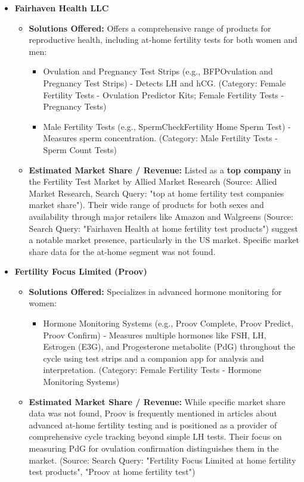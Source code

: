 \documentclass{article}
\begin{document}
\begin{itemize}[label=\textbullet]
    \item \textbf{Fairhaven Health LLC}
    \begin{itemize}[label=--]
        \item \textbf{Solutions Offered:} Offers a comprehensive range of products for reproductive health, including at-home fertility tests for both women and men:
        \begin{itemize}[label=$\circ$]
            \item Ovulation and Pregnancy Test Strips (e.g., BFP\texttrademark Ovulation and Pregnancy Test Strips) - Detects LH and hCG. (Category: Female Fertility Tests - Ovulation Predictor Kits; Female Fertility Tests - Pregnancy Tests)
            \item Male Fertility Tests (e.g., SpermCheck\texttrademark Fertility Home Sperm Test) - Measures sperm concentration. (Category: Male Fertility Tests - Sperm Count Tests)
        \end{itemize}
        \item \textbf{Estimated Market Share / Revenue:} Listed as a \textbf{top company} in the Fertility Test Market by Allied Market Research (Source: Allied Market Research, Search Query: "top at home fertility test companies market share"). Their wide range of products for both sexes and availability through major retailers like Amazon and Walgreens (Source: Search Query: "Fairhaven Health at home fertility test products") suggest a notable market presence, particularly in the US market. Specific market share data for the at-home segment was not found.
    \end{itemize}
    \vspace{0.5em} %

    \item \textbf{Fertility Focus Limited (Proov)}
    \begin{itemize}[label=--]
        \item \textbf{Solutions Offered:} Specializes in advanced hormone monitoring for women:
        \begin{itemize}[label=$\circ$]
            \item Hormone Monitoring Systems (e.g., Proov Complete, Proov Predict, Proov Confirm) - Measures multiple hormones like FSH, LH, Estrogen (E3G), and Progesterone metabolite (PdG) throughout the cycle using test strips and a companion app for analysis and interpretation. (Category: Female Fertility Tests - Hormone Monitoring Systems)
        \end{itemize}
        \item \textbf{Estimated Market Share / Revenue:} While specific market share data was not found, Proov is frequently mentioned in articles about advanced at-home fertility testing and is positioned as a provider of comprehensive cycle tracking beyond simple LH tests. Their focus on measuring PdG for ovulation confirmation distinguishes them in the market. (Source: Search Query: "Fertility Focus Limited at home fertility test products", "Proov at home fertility test")
    \end{itemize}
    \vspace{0.5em} %


\end{itemize}
\end{document}
